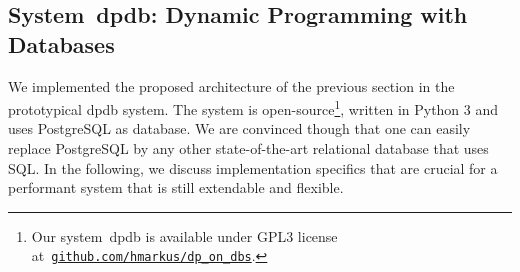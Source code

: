 \documentclass{llncs}
\newcommand{\dpdb}{{\small\textsf{dpdb}}\xspace}
\begin{document}
%
%

\subsection{System~\dpdb: Dynamic Programming with Databases}

We implemented the proposed architecture of the previous section in the prototypical \dpdb system.
The system is open-source\footnote{Our system~\dpdb is available under GPL3 license
    at~\href{https://github.com/hmarkus/dp_on_dbs/releases/tag/TODOv1.001-pre}{\nolinkurl{github.com/hmarkus/dp_on_dbs}}.}, written in Python 3 and uses PostgreSQL as database.
We are convinced though that one can easily replace PostgreSQL by any other state-of-the-art relational database that uses SQL.
%
%
In the following, we discuss implementation specifics that are crucial for a performant system that is still extendable and flexible.
\end{document}
